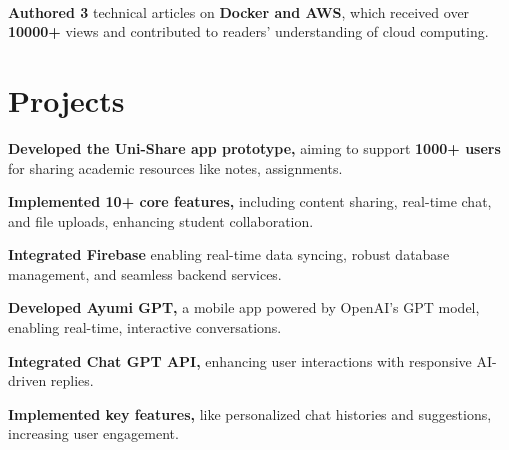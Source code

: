 \documentclass[]{deedy-resume-openfont}
\begin{document}
\vspace{0.7mm}
\hfill {} \\
\vspace{0.7mm}
\hfill {}
\vspace{1.7mm}
\begin{tightemize}
	\item \textbf{Authored 3} technical articles on \textbf{Docker and AWS}, which received over \textbf{10000+} views and contributed to readers' understanding of cloud computing.
\end{tightemize}
\sectionsep


\section{Projects}

\hfill {}
\vspace{1.7mm}
\begin{tightemize}
	\item \textbf{Developed the Uni-Share app prototype,} aiming to support \textbf{1000+ users} for sharing academic resources like notes, assignments.
    \vspace{-1.7mm}
	\item \textbf{Implemented 10+ core features,} including content sharing, real-time chat, and file uploads, enhancing student collaboration.
    \vspace{-1.7mm}
    \item \textbf{Integrated Firebase} enabling real-time data syncing, robust database management, and seamless backend services.
\end{tightemize}
\sectionsep

\vspace{1.7mm}
\hfill {}
\begin{tightemize}
    \item \textbf{Developed Ayumi GPT,} a mobile app powered by OpenAI’s GPT model, enabling real-time, interactive conversations.    
    \vspace{-1.7mm}
    \item \textbf{Integrated Chat GPT API,} enhancing user interactions with responsive AI-driven replies.
    \vspace{-1.7mm}
	\item \textbf{Implemented key features,} like personalized chat histories and suggestions, increasing user engagement.
\end{tightemize}
\sectionsep
\end{document}
